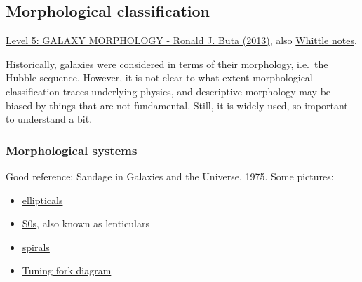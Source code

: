 \documentclass{article}
\begin{document}
\subsection{Morphological classification}
\href{https://ned.ipac.caltech.edu/level5/Sept11/Buta/frames.html}
{Level 5: GALAXY MORPHOLOGY - Ronald J. Buta (2013)}, also
\href{http://people.virginia.edu/~dmw8f/astr5630/Topic02/Lecture_2.html}
{Whittle notes}.

Historically, galaxies were considered in terms of their morphology, i.e.\
the Hubble sequence. However, it is not clear to what extent
morphological classification traces underlying physics, and descriptive
morphology may be biased by things that are not fundamental. Still, it
is widely used, so important to understand a bit.

\subsubsection{Morphological systems}
Good reference: Sandage in Galaxies and the Universe, 1975.
Some pictures:
\begin{itemize}
    \item \href{http://astronomy.nmsu.edu/holtz/a555/html/diagrams/a616/ellips.htm}
        {{ellipticals}}
    \item \href{http://astronomy.nmsu.edu/holtz/a555/html/diagrams/a616/s0.htm}
        {{S0s}}, also known as lenticulars
    \item \href{http://astronomy.nmsu.edu/holtz/a555/html/diagrams/a616/spirals.htm}
        {{spirals}}
    \item \href{http://people.virginia.edu/~dmw8f/astr5630/Topic02/t2_hubble_tfork.html}
        {{Tuning fork diagram}}
\end{itemize}
\end{document}
